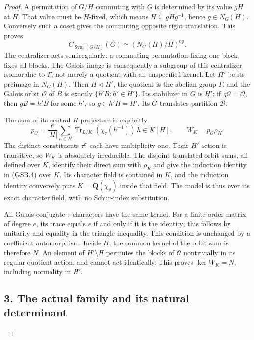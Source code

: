 \begin{proof}
A permutation of \(G/H\) commuting with \(G\) is determined by its
value \(gH\) at \(H\). That value must be \(H\)-fixed, which means
\(H\subseteq gHg^{-1}\), hence \(g\in N_G(H)\). Conversely such
a coset gives the commuting opposite right translation. This proves
\[
 C_{\operatorname{Sym}(G/H)}(G)
          \simeq (N_G(H)/H)^{\mathrm{op}}.
 \tag{GSB.9}
\]
The centralizer acts semiregularly: a commuting permutation fixing one
block fixes all blocks. The Galois image is consequently a subgroup
of this centralizer isomorphic to \(\Gamma\), not merely a quotient
with an unspecified kernel. Let \(H'\) be its preimage in \(N_G(H)\).
Then \(H\triangleleft H'\), the quotient is the abelian group
\(\Gamma\), and the Galois orbit \(\mathcal O\) of \(B\) is exactly
\(\{h'B:h'\in H'\}\). Its stabilizer in \(G\) is \(H'\):
if \(g\mathcal O=\mathcal O\), then \(gB=h'B\) for some \(h'\),
so \(g\in h'H=H'\). Its \(G\)-translates partition \(\mathcal B\).

The sum of its central \(H\)-projectors is explicitly
\[
 p_{\mathcal O}=\frac{e}{|H|}\sum_{h\in H}
       \operatorname{Tr}_{L/K}(\chi_\tau(h^{-1}))\,h
       \in K[H],\qquad W_K=p_{\mathcal O}\rho_K.
 \tag{GSB.10}
\]
The distinct constituents \(\tau^\sigma\) each have multiplicity one.
Their \(H'\)-action is transitive, so \(W_K\) is absolutely
irreducible. The disjoint translated orbit sums, all defined over
\(K\), identify their direct sum with \(\rho_K\) and give the
induction identity in (GSB.4) over \(K\). Its character field is
contained in \(K\), and the induction identity conversely puts
\(K=\mathbf Q(\chi_\rho)\) inside that field. The model is thus
over its exact character field, with no Schur-index substitution.

All Galois-conjugate \(\tau\)-characters have the same kernel.
For a finite-order matrix of degree \(e\), its trace equals \(e\)
if and only if it is the identity; this follows by unitarity and
equality in the triangle inequality. This condition is unchanged
by a coefficient automorphism. Inside \(H\), the common kernel
of the orbit sum is therefore \(N\). An element of \(H'\setminus H\)
permutes the blocks of \(\mathcal O\) nontrivially in its regular
quotient action, and cannot act identically. This proves
\(\ker W_K=N\), including normality in \(H'\).

\subsection*{3. The actual family and its natural determinant}


\end{proof}
